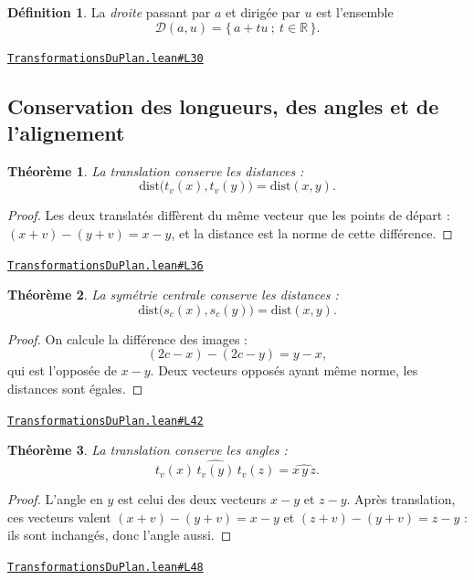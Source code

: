 \documentclass[11pt,a4paper]{article}
\theoremstyle{definition}
\newtheorem{definition}{Définition}
\theoremstyle{plain}
\newtheorem{theoreme}{Théorème}
\newcommand{\source}[2]{\par\smallskip\noindent\hfill{\footnotesize\href{#1}{\texttt{#2}}}\par\smallskip}
\begin{document}
\begin{definition}
La \emph{droite} passant par $a$ et dirigée par $u$ est l'ensemble
\[ \mathcal{D}(a, u) = \{\, a + tu \ ;\ t \in \mathbb{R} \,\} . \]
\end{definition}
\source{https://github.com/Commutator-IO/learn-lean/blob/main/courses/01-college/03-transformations-du-plan/TransformationsDuPlan.lean\#L30}{TransformationsDuPlan.lean\#L30}

\subsection{Conservation des longueurs, des angles et de l'alignement}

\begin{theoreme}
La translation conserve les distances :
\[ \mathrm{dist}\bigl(t_v(x), t_v(y)\bigr) = \mathrm{dist}(x, y) . \]
\end{theoreme}

\begin{proof}
Les deux translatés diffèrent du même vecteur que les points de départ :
$(x + v) - (y + v) = x - y$, et la distance est la norme de cette différence.
\end{proof}
\source{https://github.com/Commutator-IO/learn-lean/blob/main/courses/01-college/03-transformations-du-plan/TransformationsDuPlan.lean\#L36}{TransformationsDuPlan.lean\#L36}

\begin{theoreme}
La symétrie centrale conserve les distances :
\[ \mathrm{dist}\bigl(s_c(x), s_c(y)\bigr) = \mathrm{dist}(x, y) . \]
\end{theoreme}

\begin{proof}
On calcule la différence des images :
\[ (2c - x) - (2c - y) = y - x , \]
qui est l'opposée de $x - y$. Deux vecteurs opposés ayant même norme, les distances sont
égales.
\end{proof}
\source{https://github.com/Commutator-IO/learn-lean/blob/main/courses/01-college/03-transformations-du-plan/TransformationsDuPlan.lean\#L42}{TransformationsDuPlan.lean\#L42}

\begin{theoreme}
La translation conserve les angles :
\[ \widehat{t_v(x)\,t_v(y)\,t_v(z)} = \widehat{x\,y\,z} . \]
\end{theoreme}

\begin{proof}
L'angle en $y$ est celui des deux vecteurs $x - y$ et $z - y$. Après translation, ces
vecteurs valent $(x+v) - (y+v) = x - y$ et $(z+v) - (y+v) = z - y$ : ils sont inchangés,
donc l'angle aussi.
\end{proof}
\source{https://github.com/Commutator-IO/learn-lean/blob/main/courses/01-college/03-transformations-du-plan/TransformationsDuPlan.lean\#L48}{TransformationsDuPlan.lean\#L48}
\end{document}
